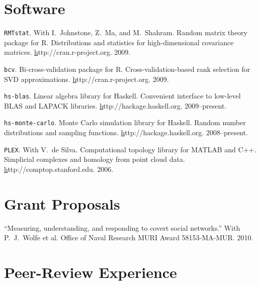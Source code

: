 \documentclass[overlapped,line,letterpaper]{res}
\begin{document}
\begin{resume}


\section{\bf Software}

{\texttt{RMTstat}}. With I.\ Johnstone, Z.\ Ma, and M.\ Shahram.
Random matrix theory package for R.
Distributions and statistics for high-dimensional covariance matrices.
\href{http://cran.r-project.org/web/packages/RMTstat/index.html}http://cran.r-project.org.  2009.

{\texttt{bcv}}.
Bi-cross-validation package for R.
Cross-validation-based rank selection for SVD approximations.
\href{http://cran.r-project.org/web/packages/bcv/index.html}http://cran.r-project.org.  2009.

{\texttt{hs-blas}}.
Linear algebra library for Haskell.
Convenient interface to low-level BLAS and LAPACK libraries.
\href{http://hackage.haskell.org/cgi-bin/hackage-scripts/package/blas}http://hackage.haskell.org.  2009--present.

{\texttt{hs-monte-carlo}}.
Monte Carlo simulation library for Haskell.  Random number distributions
and sampling functions.
\href{http://hackage.haskell.org/cgi-bin/hackage-scripts/package/monte-carlo}http://hackage.haskell.org.  2008--present.

{\texttt{PLEX}}. With V.\ de Silva.
Computational topology library for \textsc{MATLAB} and C++.
Simplicial complexes and homology from point cloud data.
\href{http://comptop.stanford.edu/programs/plex.html}http://comptop.stanford.edu.  2006.



\section{\bf Grant Proposals}

``Measuring, understanding, and responding to covert social networks.''
With P.\ J.\ Wolfe et al.
Office of Naval Research MURI Award 58153-MA-MUR.
2010.


\section{\bf Peer-Review Experience}


\end{resume}
\end{document}
